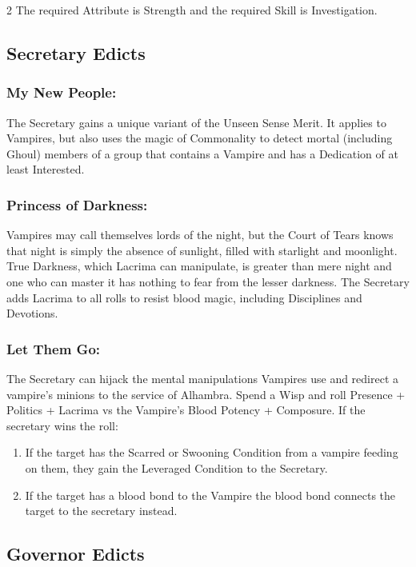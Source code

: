 \begin{multicols}{2}
The required Attribute is Strength and the required Skill is Investigation. 

\subsection*{Secretary Edicts}

\subsubsection*{My New People:} The Secretary gains a unique variant of the Unseen Sense Merit. It applies to Vampires, but also uses the magic of Commonality to detect mortal (including Ghoul) members of a group that contains a Vampire and has a Dedication of at least Interested.

\subsubsection*{Princess of Darkness:} Vampires may call themselves lords of the night, but the Court of Tears knows that night is simply the absence of sunlight, filled with starlight and moonlight. True Darkness, which Lacrima can manipulate, is greater than mere night and one who can master it has nothing to fear from the lesser darkness. The Secretary adds Lacrima to all rolls to resist blood magic, including Disciplines and Devotions.

\subsubsection*{Let Them Go:} The Secretary can hijack the mental manipulations Vampires use and redirect a vampire's minions to the service of Alhambra. Spend a Wisp and roll Presence + Politics + Lacrima vs the Vampire's Blood Potency + Composure. If the secretary wins the roll:

\begin{enumerate}\item If the target has the Scarred or Swooning Condition from a vampire feeding on them, they gain the Leveraged Condition to the Secretary.
\item If the target has a blood bond to the Vampire the blood bond connects the target to the secretary instead.\end{enumerate}

\subsection*{Governor Edicts}


\end{multicols}
